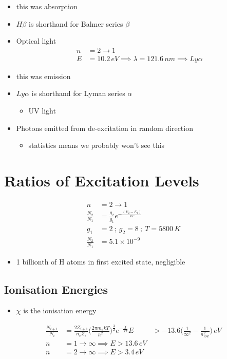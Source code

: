 \documentclass[a4paper,11pt,normalem]{article}
\begin{document}
\begin{itemize}
    \item this was absorption
    \item \(H\beta\) is shorthand for Balmer series \(\beta\)
    \item Optical light
        \begin{align}
            n &= 2 \to 1 \\
            E &= 10.2\,eV \implies \lambda = 121.6\,nm \implies Ly\alpha
        \end{align}
    \item this was emission
    \item\(Ly\alpha\) is shorthand for Lyman series \(\alpha\)
          \begin{itemize}
            \item UV light
          \end{itemize}
    \item Photons emitted from de-excitation in random direction
        \begin{itemize}
            \item statistics means we probably won't see this
        \end{itemize}
\end{itemize}

\section{Ratios of Excitation Levels}
\begin{align}
    n &= 2 \to 1 \\
    \frac{N_2}{N_1} &= \frac{g_2}{g_1} e^{-\frac{(E_2 - E_1)}{kT}} \\
    g_1 &= 2 ~;~ g_2 = 8 ~;~ T = 5800\,K \\
    \frac{N_2}{N_1} &= 5.1 \times 10^{-9}
\end{align}
\begin{itemize}
    \item 1 billionth of H atoms in first excited state, negligible
\end{itemize}

\subsection{Ionisation Energies}
\begin{itemize}
    \item \(\chi\) is the ionisation energy
\end{itemize}
\begin{align}
    \frac{N_{i + 1}}{N_i} &= \frac{2Z_{i + 1}}{n_e Z_i} \Big(\frac{2\pi m_e kT}{h^2}\Big)^{\frac{3}{2}}e^{-\frac{\chi}{kT}} 
    E &> -13.6\Big(\frac{1}{\infty^2} - \frac{1}{n_{low}^2} \Big)\, eV \\
    n &= 1 \to \infty \implies E > 13.6\,eV \\
    n &= 2 \to \infty \implies E > 3.4\,eV
\end{align}
\end{document}
